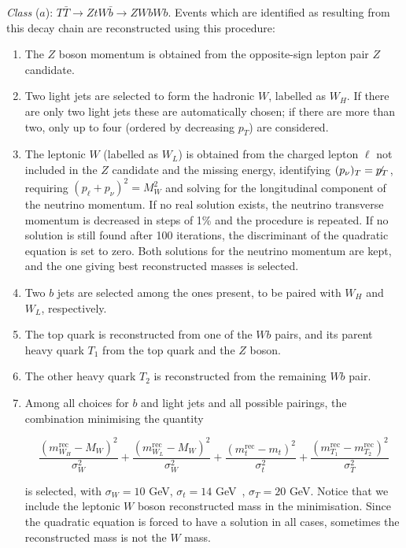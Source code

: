 \documentclass[12pt,a4paper]{article}
\newcommand{\TT}{T \bar T}
\newcommand{\ptmiss}{p_T\!\!\!\!\!\!\!\!\not\,\,\,\,\,\,\,}
\begin{document}
{\em Class} ($a$): $\TT \to Zt W \bar b \to Z Wb Wb$. Events which are identified as resulting from this decay chain are reconstructed using this procedure:
\begin{enumerate}
\item The $Z$ boson momentum is obtained from the opposite-sign lepton pair $Z$ candidate. 
\item Two light jets are selected to form the hadronic $W$, labelled as $W_H$.
If there are only two light jets these are automatically chosen; if there are more than two, only up to four (ordered by decreasing $p_T$) are considered. 
\item The leptonic $W$ (labelled as $W_L$) is obtained from the charged lepton $\ell$ not included in the $Z$ candidate and the missing energy, identifying $(p_\nu)_T = \ptmiss$, requiring $(p_{\ell}+p_\nu)^2 = M_W^2$ and solving for the longitudinal component of the neutrino momentum. If no real solution exists, the neutrino transverse momentum is decreased in steps of 1\% and the procedure is repeated. If no solution is still found after 100 iterations, the discriminant of the quadratic equation is set to zero.
Both solutions for the neutrino momentum are kept, and the one giving best reconstructed masses is selected.
\item Two $b$ jets are selected among the ones present, to be paired with $W_H$ and $W_L$, respectively.
\item The top quark is reconstructed from one of the $Wb$ pairs, and its parent heavy quark $T_1$ from the top quark and the $Z$ boson.
\item The other heavy quark $T_2$ is reconstructed from the remaining $Wb$ pair.
\item Among all choices for $b$ and light jets and all possible pairings, the combination minimising the quantity
\begin{small}
\begin{equation}
\frac{(m_{W_H}^\text{rec}-M_W)^2}{\sigma_W^2} + 
\frac{(m_{W_L}^\text{rec}-M_W)^2}{\sigma_W^2} + 
\frac{(m_t^\text{rec}-m_t)^2}{\sigma_t^2} +
\frac{(m_{T_1}^\text{rec}-m_{T_2}^\text{rec})^2}{\sigma_T^2}
\end{equation}
\end{small}%
is selected, with $\sigma_W = 10$ GeV, $\sigma_t = 14$ GeV~\cite{Aad:2009wy}, $\sigma_T = 20$ GeV. Notice that we include the leptonic $W$ boson reconstructed mass in the minimisation. Since the quadratic equation is forced to have a solution in all cases, sometimes the reconstructed mass is not the $W$ mass.
\end{enumerate}
\end{document}
